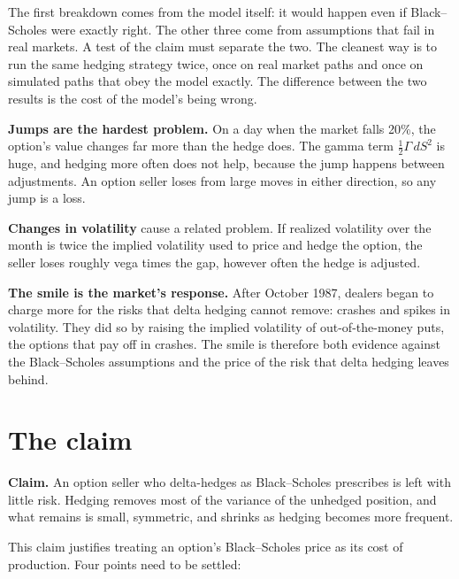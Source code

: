 The first breakdown comes from the model itself: it would happen even if Black--Scholes were exactly right. The other three come from assumptions that fail in real markets. A test of the claim must separate the two. The cleanest way is to run the same hedging strategy twice, once on real market paths and once on simulated paths that obey the model exactly. The difference between the two results is the cost of the model's being wrong.

\textbf{Jumps are the hardest problem.} On a day when the market falls 20\%, the option's value changes far more than the hedge does. The gamma term $\tfrac{1}{2}\Gamma\,dS^2$ is huge, and hedging more often does not help, because the jump happens between adjustments. An option seller loses from large moves in either direction, so any jump is a loss.

\textbf{Changes in volatility} cause a related problem. If realized volatility over the month is twice the implied volatility used to price and hedge the option, the seller loses roughly vega times the gap, however often the hedge is adjusted.

\textbf{The smile is the market's response.} After October 1987, dealers began to charge more for the risks that delta hedging cannot remove: crashes and spikes in volatility. They did so by raising the implied volatility of out-of-the-money puts, the options that pay off in crashes. The smile is therefore both evidence against the Black--Scholes assumptions and the price of the risk that delta hedging leaves behind.


\section{The claim}
\label{sec:14-claim}

\begin{callout}
\textbf{Claim.} An option seller who delta-hedges as Black--Scholes prescribes is left with little risk. Hedging removes most of the variance of the unhedged position, and what remains is small, symmetric, and shrinks as hedging becomes more frequent.
\end{callout}

This claim justifies treating an option's Black--Scholes price as its cost of production. Four points need to be settled:

